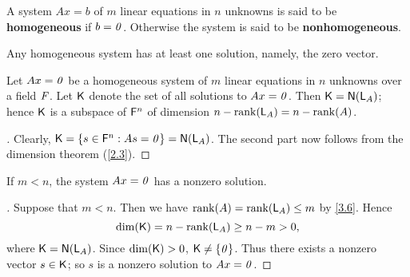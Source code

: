 \begin{defn}\label{3.3.2}
  A system \(Ax = b\) of \(m\) linear equations in \(n\) unknowns is said to be \textbf{homogeneous} if \(b = \mathit{0}\).
  Otherwise the system is said to be \textbf{nonhomogeneous}.
\end{defn}

\begin{note}
  Any homogeneous system has at least one solution, namely, the zero vector.
\end{note}

\begin{thm}\label{3.8}
  Let \(Ax = \mathit{0}\) be a homogeneous system of \(m\) linear equations in \(n\) unknowns over a field \(\mathit{F}\).
  Let \(\mathsf{K}\) denote the set of all solutions to \(Ax = \mathit{0}\).
  Then \(\vs{K} = \ns{\L_A}\);
  hence \(\mathsf{K}\) is a subspace of \(\mathsf{F}^n\) of dimension \(n - \rk{\L_A} = n - \rk{A}\).
\end{thm}

\begin{proof}[]
  Clearly, \(\vs{K} = \set{s \in \vs{F}^n : As = \zv} = \ns{\L_A}\).
  The second part now follows from the dimension theorem (\cref{2.3}).
\end{proof}

\begin{cor}\label{3.3.3}
  If \(m < n\), the system \(Ax = \mathit{0}\) has a nonzero solution.
\end{cor}

\begin{proof}[]
  Suppose that \(m < n\).
  Then we have \(\rk{A} = \rk{\L_A} \leq m\) by \cref{3.6}.
  Hence
  \[
    \dim(\vs{K}) = n - \rk{\L_A} \geq n - m > 0,
  \]
  where \(\vs{K} = \ns{\L_A}\).
  Since \(\dim(\mathsf{K}) > 0\), \(\mathsf{K} \neq \left\lbrace\mathit{0}\right\rbrace\).
  Thus there exists a nonzero vector \(s \in \mathsf{K}\);
  so \(s\) is a nonzero solution to \(Ax = \mathit{0}\).
\end{proof}
